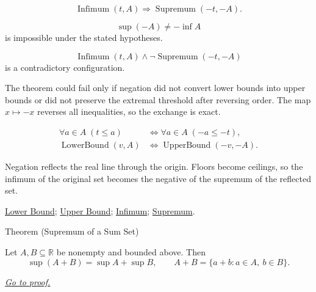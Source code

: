 \begin{remark*}
\[
\operatorname{Infimum}(t,A)
\Longrightarrow
\operatorname{Supremum}(-t,-A).
\]
\end{remark*}

\begin{remark*}
\[
\sup(-A)\ne -\inf A
\]
is impossible under the stated hypotheses.
\end{remark*}

\begin{remark*}
\[
\operatorname{Infimum}(t,A)\land \neg\operatorname{Supremum}(-t,-A)
\]
is a contradictory configuration.
\end{remark*}

\begin{remark*}
The theorem could fail only if negation did not convert lower bounds into upper bounds or did not preserve the extremal threshold after reversing order. The map $x\mapsto -x$ reverses all inequalities, so the exchange is exact.
\end{remark*}

\begin{remark*}
\[
\begin{aligned}
\forall a\in A\;(t\le a)
&\Longleftrightarrow
\forall a\in A\;(-a\le -t),\\
\operatorname{LowerBound}(v,A)
&\Longleftrightarrow
\operatorname{UpperBound}(-v,-A).
\end{aligned}
\]
\end{remark*}

\begin{remark*}[Interpretation]
Negation reflects the real line through the origin. Floors become ceilings, so the infimum of the original set becomes the negative of the supremum of the reflected set.
\end{remark*}

\begin{dependencies}
\hyperref[def:lower-bound]{Lower Bound};
\hyperref[def:upper-bound]{Upper Bound};
\hyperref[def:infimum]{Infimum};
\hyperref[def:supremum]{Supremum}.
\end{dependencies}





\begin{theorembox}{Theorem (Supremum of a Sum Set)}
\begin{theorem}
\label{thm:supremum-sum-set}
Let $A,B\subseteq\mathbb{R}$ be nonempty and bounded above. Then
\[
  \sup(A+B)=\sup A+\sup B,
  \qquad
  A+B=\{a+b:a\in A,\ b\in B\}.
\]

\smallskip
\noindent
\hyperref[prf:supremum-sum-set]{\textit{Go to proof.}}
\end{theorem}
\end{theorembox}

